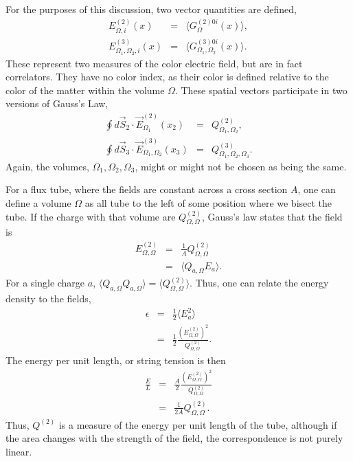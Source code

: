 \documentclass[aps, prc, 12pt, nofootinbib, showpacs, superscriptaddress, tightenlines, groupedaddress]{revtex4-2}
\begin{document}
For the purposes of this discussion, two vector quantities are defined,
\begin{eqnarray}
E^{(2)}_{\Omega,i}(x)&=&\langle G^{(2)0i}_{\Omega}(x)\rangle,\\
\nonumber
E^{(3)}_{\Omega_1,\Omega_2,i}(x)&=&\langle G^{(3)0i}_{\Omega_1,\Omega_2}(x)\rangle.
\end{eqnarray}
These represent two measures of the color electric field, but are in fact correlators. They have no color index, as their color is defined relative to the color of the matter within the volume $\Omega$. These spatial vectors participate in two versions of Gauss's Law,
\begin{eqnarray}\label{eq:gauss}
 \oint d\vec{S}_2\cdot\vec{E}^{(2)}_{\Omega_1}(x_2)&=&Q^{(2)}_{\Omega_1,\Omega_2},\\
 \nonumber
 \oint d\vec{S}_3\cdot\vec{E}^{(3)}_{\Omega_1,\Omega_2}(x_3)&=&Q^{(3)}_{\Omega_1,\Omega_2,\Omega_3}.
\end{eqnarray}
Again, the volumes, $\Omega_1,\Omega_2,\Omega_3$, might or might not be chosen as being the same.

For a flux tube, where the fields are constant across a cross section $A$, one can define a volume $\Omega$ as all tube to the left of some position where we bisect the tube. If the charge with that volume are $Q^{(2)}_{\Omega,\Omega}$, Gauss's law states that the field is 
\begin{eqnarray}
E^{(2)}_{\Omega,\Omega}&=&\frac{1}{A}Q^{(2)}_{\Omega,\Omega}\\
\nonumber
&=&\langle Q_{a,\Omega}E_a\rangle.
\end{eqnarray}
For a single charge $a$, $\langle Q_{a,\Omega}Q_{a,\Omega}\rangle=\langle Q^{(2)}_{\Omega,\Omega}\rangle$. Thus, one can relate the energy density to the fields,
\begin{eqnarray}
 \epsilon&=&\frac{1}{2}\langle E_a^2\rangle\\
 \nonumber
 &=&\frac{1}{2}\frac{(E^{(2)}_{\Omega,\Omega})^2}{Q^{(2)}_{\Omega,\Omega}}.
\end{eqnarray}
The energy per unit length, or string tension is then
\begin{eqnarray}\label{eq:tension}
\frac{E}{L}&=&\frac{A}{2}\frac{(E^{(2)}_{\Omega,\Omega})^2}{Q^{(2)}_{\Omega,\Omega}}\\
\nonumber
&=&\frac{1}{2A}Q^{(2)}_{\Omega,\Omega}.
\end{eqnarray}
Thus, $Q^{(2)}$ is a measure of the energy per unit length of the tube, although if the area changes with the strength of the field, the correspondence is not purely linear.
\end{document}
